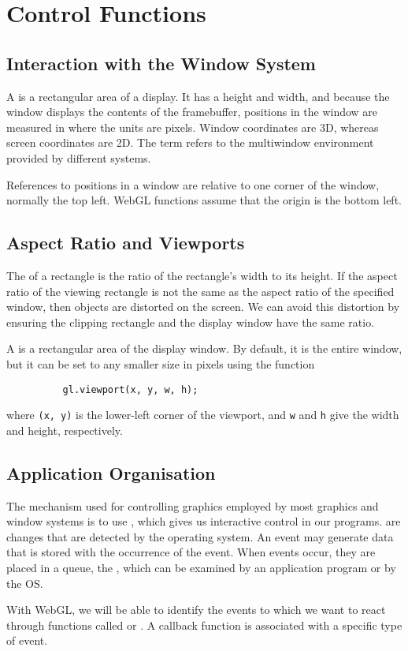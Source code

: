 \documentclass[../notes.tex]{subfiles}
\begin{document}
    \section{Control Functions}
      \subsection{Interaction with the Window System}
        A  is a rectangular area of a display.
        It has a height and width, and because the window displays the contents of the framebuffer,
        positions in the window are measured in 
        where the units are pixels.
        Window coordinates are 3D, whereas screen coordinates are 2D.
        The term  refers to the multiwindow environment provided
        by different systems.

        References to positions in a window are relative to one corner of the window,
        normally the top left.
        WebGL functions assume that the origin is the bottom left.

      \subsection{Aspect Ratio and Viewports}
        The  of a rectangle is the ratio of the rectangle's
        width to its height.
        If the aspect ratio of the viewing rectangle is not the same as the aspect ratio
        of the specified window, then objects are distorted on the screen.
        We can avoid this distortion by ensuring the clipping rectangle and the display window
        have the same ratio.

        A  is a rectangular area of the display window.
        By default, it is the entire window, but it can be set to any smaller size in pixels
        using the function
        \begin{verbatim}
          gl.viewport(x, y, w, h);
        \end{verbatim}
        where \texttt{(x, y)} is the lower-left corner of the viewport,
        and \texttt{w} and \texttt{h} give the width and height, respectively.

      \subsection{Application Organisation}
        The mechanism used for controlling graphics employed by most graphics and window systems
        is to use , which gives us interactive control in our programs.
         are changes that are detected by the operating system.
        An event may generate data that is stored with the occurrence of the event.
        When events occur, they are placed in a queue, the ,
        which can be examined by an application program or by the OS.

        With WebGL, we will be able to identify the events to which we want to react through
        functions called  or .
        A callback function is associated with a specific type of event.

\end{document}
